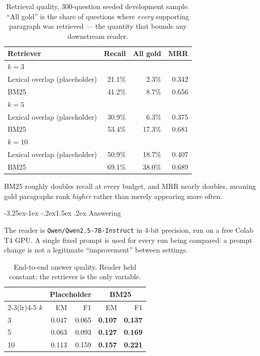 \documentclass[11pt,a4paper]{article}
\makeatletter
\renewcommand\subsection{\@startsection{subsection}{2}{\z@}%
  {-3.25ex\@plus -1ex \@minus -.2ex}{1.5ex \@plus .2ex}%
  {\color{accent}\normalfont\large\bfseries}}
\newcommand{\code}[1]{\texttt{\small #1}}
\makeatother
\begin{document}
\begin{table}[H]
\centering
\caption{Retrieval quality, 300-question seeded development sample.
``All gold'' is the share of questions where \emph{every} supporting paragraph
was retrieved --- the quantity that bounds any downstream reader.}
\begin{tabular}{lrrr}
\toprule
\textbf{Retriever} & \textbf{Recall} & \textbf{All gold} & \textbf{MRR} \\
\midrule
\multicolumn{4}{l}{\textit{$k = 3$}} \\
Lexical overlap (placeholder) & 21.1\% & 2.3\%  & 0.342 \\
BM25                          & 41.2\% & 8.7\%  & 0.656 \\
\midrule
\multicolumn{4}{l}{\textit{$k = 5$}} \\
Lexical overlap (placeholder) & 30.9\% & 6.3\%  & 0.375 \\
BM25                          & 53.4\% & 17.3\% & 0.681 \\
\midrule
\multicolumn{4}{l}{\textit{$k = 10$}} \\
Lexical overlap (placeholder) & 50.9\% & 18.7\% & 0.407 \\
BM25                          & 69.1\% & 38.0\% & 0.689 \\
\bottomrule
\end{tabular}
\end{table}

BM25 roughly doubles recall at every budget, and MRR nearly doubles, meaning gold
paragraphs rank \emph{higher} rather than merely appearing more often.

\subsection{Answering}

The reader is \code{Qwen/Qwen2.5-7B-Instruct} in 4-bit precision, run on a free
Colab T4 GPU. A single fixed prompt is used for every run being compared: a
prompt change is not a legitimate ``improvement'' between settings.

\begin{table}[H]
\centering
\caption{End-to-end answer quality. Reader held constant; the retriever is the
only variable.}
\begin{tabular}{lrrrr}
\toprule
& \multicolumn{2}{c}{\textbf{Placeholder}} & \multicolumn{2}{c}{\textbf{BM25}} \\
\cmidrule(lr){2-3}\cmidrule(lr){4-5}
\textbf{$k$} & EM & F1 & EM & F1 \\
\midrule
3  & 0.047 & 0.065 & \textbf{0.107} & \textbf{0.137} \\
5  & 0.063 & 0.093 & \textbf{0.127} & \textbf{0.169} \\
10 & 0.113 & 0.159 & \textbf{0.157} & \textbf{0.221} \\
\bottomrule
\end{tabular}
\end{table}
\end{document}
